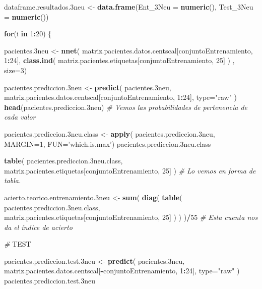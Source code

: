 \documentclass[]{article}
\newenvironment{Shaded}{\begin{snugshade}}{\end{snugshade}}
\newcommand{\KeywordTok}[1]{\textcolor[rgb]{0.13,0.29,0.53}{\textbf{#1}}}
\newcommand{\DataTypeTok}[1]{\textcolor[rgb]{0.13,0.29,0.53}{#1}}
\newcommand{\DecValTok}[1]{\textcolor[rgb]{0.00,0.00,0.81}{#1}}
\newcommand{\StringTok}[1]{\textcolor[rgb]{0.31,0.60,0.02}{#1}}
\newcommand{\CommentTok}[1]{\textcolor[rgb]{0.56,0.35,0.01}{\textit{#1}}}
\newcommand{\ControlFlowTok}[1]{\textcolor[rgb]{0.13,0.29,0.53}{\textbf{#1}}}
\newcommand{\OperatorTok}[1]{\textcolor[rgb]{0.81,0.36,0.00}{\textbf{#1}}}
\newcommand{\AlertTok}[1]{\textcolor[rgb]{0.94,0.16,0.16}{#1}}
\newcommand{\NormalTok}[1]{#1}
\begin{document}
\begin{Shaded}
\begin{Highlighting}[]
\NormalTok{dataframe.resultados.3neu <-}\StringTok{ }\KeywordTok{data.frame}\NormalTok{(}\DataTypeTok{Ent_3Neu =} \KeywordTok{numeric}\NormalTok{(),}
                                        \DataTypeTok{Test_3Neu =} \KeywordTok{numeric}\NormalTok{())}

\ControlFlowTok{for}\NormalTok{(i }\ControlFlowTok{in} \DecValTok{1}\OperatorTok{:}\DecValTok{20}\NormalTok{)}
\NormalTok{\{}

\NormalTok{  pacientes.3neu <-}\StringTok{ }\KeywordTok{nnet}\NormalTok{( matriz.pacientes.datos.centscal[conjuntoEntrenamiento, }\DecValTok{1}\OperatorTok{:}\DecValTok{24}\NormalTok{], }\KeywordTok{class.ind}\NormalTok{( matriz.pacientes.etiquetas[conjuntoEntrenamiento, }\DecValTok{25}\NormalTok{] ) , }\DataTypeTok{size=}\DecValTok{3}\NormalTok{)}
  
\NormalTok{  pacientes.prediccion.3neu <-}\StringTok{ }\KeywordTok{predict}\NormalTok{( pacientes.3neu, matriz.pacientes.datos.centscal[conjuntoEntrenamiento, }\DecValTok{1}\OperatorTok{:}\DecValTok{24}\NormalTok{], }\DataTypeTok{type=}\StringTok{"raw"}\NormalTok{ )}
  \KeywordTok{head}\NormalTok{(pacientes.prediccion.3neu) }\CommentTok{# Vemos las probabilidades de pertenencia de cada valor}
  
  
\NormalTok{  pacientes.prediccion.3neu.class <-}\StringTok{ }\KeywordTok{apply}\NormalTok{( pacientes.prediccion.3neu, }\DataTypeTok{MARGIN=}\DecValTok{1}\NormalTok{, }\DataTypeTok{FUN=}\StringTok{'which.is.max'}\NormalTok{)}
\NormalTok{  pacientes.prediccion.3neu.class}
  
  
  \KeywordTok{table}\NormalTok{( pacientes.prediccion.3neu.class, matriz.pacientes.etiquetas[conjuntoEntrenamiento, }\DecValTok{25}\NormalTok{] )  }\CommentTok{# Lo vemos en forma de tabla.}
  
  
\NormalTok{  acierto.teorico.entrenamiento.3neu <-}\StringTok{ }\KeywordTok{sum}\NormalTok{( }\KeywordTok{diag}\NormalTok{( }\KeywordTok{table}\NormalTok{( pacientes.prediccion.3neu.class, matriz.pacientes.etiquetas[conjuntoEntrenamiento, }\DecValTok{25}\NormalTok{] ) ) )}\OperatorTok{/}\DecValTok{55} \CommentTok{# Esta cuenta nos da el índice de acierto}
  
  \CommentTok{# }\AlertTok{TEST}
  
\NormalTok{  pacientes.prediccion.test.3neu <-}\StringTok{ }\KeywordTok{predict}\NormalTok{( pacientes.3neu, matriz.pacientes.datos.centscal[}\OperatorTok{-}\NormalTok{conjuntoEntrenamiento, }\DecValTok{1}\OperatorTok{:}\DecValTok{24}\NormalTok{], }\DataTypeTok{type=}\StringTok{"raw"}\NormalTok{ )}
\NormalTok{  pacientes.prediccion.test.3neu}
  

\end{Highlighting}
\end{Shaded}
\end{document}
